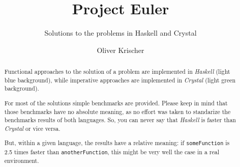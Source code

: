 \documentclass{scrreprt}
\numberwithin{equation}{chapter}
\begin{document}
\title{Project Euler}
\author{Oliver Krischer}
\subtitle{Solutions to the problems in Haskell and Crystal}
\maketitle
\begin{abstract}
  Functional approaches to the solution of a problem are implemented in \emph{Haskell} (light blue background), while imperative approaches are implemented in \emph{Crystal} (light green background).

  For most of the solutions simple benchmarks are provided.
  Please keep in mind that those benchmarks have no absolute meaning, as no effort was taken to standarize the benchmarks results of both languages.
  So, you can never say that \emph{Haskell} is faster than \emph{Crystal} or vice versa.

  But, within a given language, the results have a relative meaning: if \texttt{someFunction} is 2.5 times faster than \texttt{anotherFunction}, this might be very well the case in a real environment.
\end{abstract}
\tableofcontents





\end{document}
